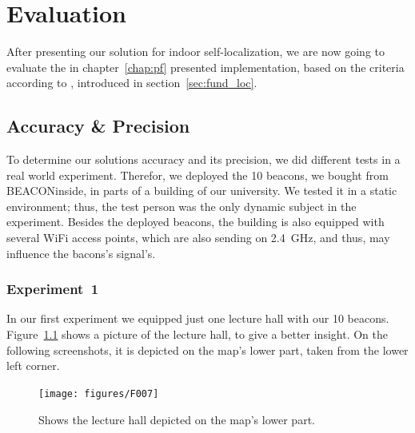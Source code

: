 \chapter{Evaluation} \label{chap:evaluation}
After presenting our solution for indoor self-localization, we are now going to evaluate the in chapter~\ref{chap:pf} presented implementation, based on the criteria according to \citet{IEEE:survey_wireless_indoor_pos}, introduced in section~\ref{sec:fund_loc}.

\section{Accuracy \& Precision}
To determine our solutions accuracy and its precision, we did different tests in a real world experiment. Therefor, we deployed the 10 beacons, we bought from BEACONinside, in parts of a building of our university. We tested it in a static environment; thus, the test person was the only dynamic subject in the experiment. Besides the deployed beacons, the building is also equipped with several WiFi access points, which are also sending on 2.4~GHz, and thus, may influence the bacons's signal's.

\subsection*{Experiment~1}
In our first experiment we equipped just one lecture hall with our 10 beacons. Figure~\ref{fig:f007} shows a picture of the lecture hall, to give a better insight. On the following screenshots, it is depicted on the map's lower part, taken from the lower left corner.

\begin{figure}
	\texttt{[image: figures/F007]}
	\caption{Shows the lecture hall depicted on the map's lower part.}
	\label{fig:f007}
\end{figure}

